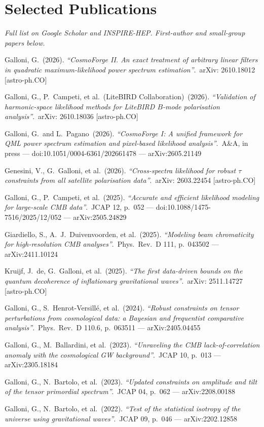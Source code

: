 \documentclass[10pt,a4paper]{article}
\newcommand{\pub}[4]{%
  \noindent #1\ (#2). \textit{``#3''}.\ {\small\textcolor{muted}{#4}}\par\vspace{0.8pt}
}
\begin{document}
\section*{Selected Publications}
{\footnotesize\itshape\textcolor{muted}{Full list on Google Scholar and INSPIRE-HEP. First-author and small-group papers below.}}\par\vspace{3pt}

\pub{Galloni, G.}{2026}{CosmoForge II. An exact treatment of arbitrary linear filters in quadratic maximum-likelihood power spectrum estimation}{arXiv: 2610.18012 [astro-ph.CO]}
\pub{Galloni, G., P.\ Campeti, et al.\ (LiteBIRD Collaboration)}{2026}{Validation of harmonic-space likelihood methods for LiteBIRD $B$-mode polarisation analysis}{arXiv: 2610.18036 [astro-ph.CO]}
\pub{Galloni, G.\ and L.\ Pagano}{2026}{CosmoForge I: A unified framework for QML power spectrum estimation and pixel-based likelihood analysis}{A\&A, in press --- doi:10.1051/0004-6361/202661478 --- arXiv:2605.21149}
\pub{Genesini, V., G.\ Galloni, et al.}{2026}{Cross-spectra likelihood for robust $\tau$ constraints from all satellite polarisation data}{arXiv: 2603.22454 [astro-ph.CO]}
\pub{Galloni, G., P.\ Campeti, et al.}{2025}{Accurate and efficient likelihood modeling for large-scale CMB data}{JCAP 12, p.\ 052 --- doi:10.1088/1475-7516/2025/12/052 --- arXiv:2505.24829}
\pub{Giardiello, S., A.\ J.\ Duivenvoorden, et al.}{2025}{Modeling beam chromaticity for high-resolution CMB analyses}{Phys.\ Rev.\ D 111, p.\ 043502 --- arXiv:2411.10124}
\pub{Kruijf, J.\ de, G.\ Galloni, et al.}{2025}{The first data-driven bounds on the quantum decoherence of inflationary gravitational waves}{arXiv: 2511.14727 [astro-ph.CO]}
\pub{Galloni, G., S.\ Henrot-Versillé, et al.}{2024}{Robust constraints on tensor perturbations from cosmological data: a Bayesian and frequentist comparative analysis}{Phys.\ Rev.\ D 110.6, p.\ 063511 --- arXiv:2405.04455}
\pub{Galloni, G., M.\ Ballardini, et al.}{2023}{Unraveling the CMB lack-of-correlation anomaly with the cosmological GW background}{JCAP 10, p.\ 013 --- arXiv:2305.18184}
\pub{Galloni, G., N.\ Bartolo, et al.}{2023}{Updated constraints on amplitude and tilt of the tensor primordial spectrum}{JCAP 04, p.\ 062 --- arXiv:2208.00188}
\pub{Galloni, G., N.\ Bartolo, et al.}{2022}{Test of the statistical isotropy of the universe using gravitational waves}{JCAP 09, p.\ 046 --- arXiv:2202.12858}

\end{document}
